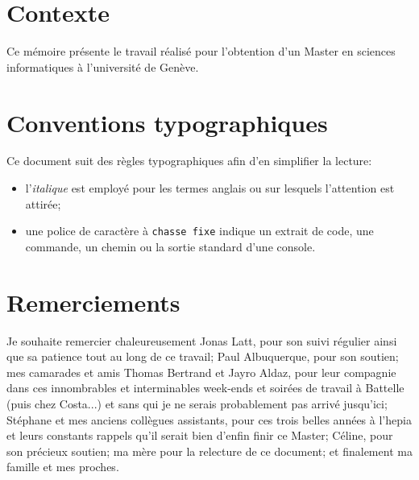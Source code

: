 \section*{Contexte}
Ce mémoire présente le travail réalisé pour l'obtention d'un Master en sciences informatiques à l'université de Genève.


\section*{Conventions typographiques}\label{title-avantpropos}

\noindent Ce document suit des règles typographiques afin d'en simplifier la lecture:

\begin{itemize}
\item l'\textit{italique} est employé pour les termes anglais ou sur lesquels l'attention est attirée;
\item une police de caractère à \texttt{chasse fixe} indique un extrait de code, une commande, un chemin ou la sortie standard d'une console.
\end{itemize}

\section*{Remerciements}
Je souhaite remercier chaleureusement Jonas Latt, pour son suivi régulier ainsi que sa patience tout au long de ce travail; Paul Albuquerque, pour son soutien; mes camarades et amis Thomas Bertrand et Jayro Aldaz, pour leur compagnie dans ces innombrables et interminables week-ends et soirées de travail à Battelle (puis chez Costa...) et sans qui je ne serais probablement pas arrivé jusqu'ici; Stéphane et mes anciens collègues assistants, pour ces trois belles années à l'hepia et leurs constants rappels qu'il serait bien d'enfin finir ce Master; Céline, pour son précieux soutien; ma mère pour la relecture de ce document; et finalement ma famille et mes proches.

